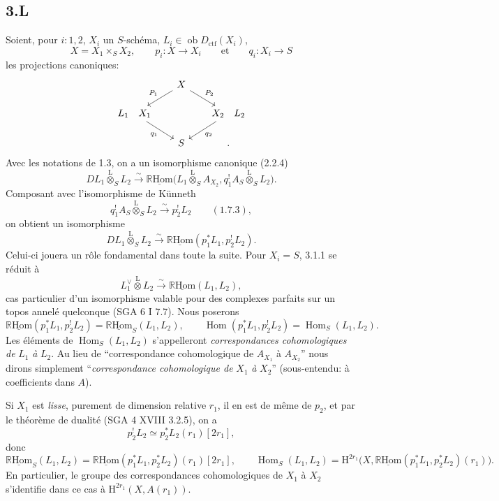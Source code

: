 \documentclass[11pt]{article}
\renewcommand{\H}{\mathrm{H}}
\DeclareMathOperator{\Hom}{Hom}
\newcommand{\R}{\mathbb{R}}\newcommand{\RHomCore}{\mathbb{R}\mathrm{Hom}}
\newcommand{\ob}{\operatorname{ob}}
\providecommand{\RHom}{\RHomCore}
\providecommand{\uRHom}{\underline{\RHom}}
\providecommand{\Dctf}{D_{\mathrm{ctf}}}
\providecommand{\Dctf}{D_{\mathrm{ctf}}}
\providecommand{\RHom}{\RHomCore}
\providecommand{\Hom}{\operatorname{Hom}}
\providecommand{\ob}{\operatorname{ob}}
\providecommand{\RHom}{\R\mathcal{H}om}
\providecommand{\R}{\mathrm R}
\providecommand{\RHom}{\RHomCore}
\providecommand{\Hom}{\operatorname{Hom}}
\begin{document}
\subsection*{3.L}
Soient, pour $i:1,2$, $X_i$ un $S$-schéma, $L_i\in\ob\Dctf(X_i)$,
\[
X=X_1\times_S X_2,
\qquad
p_i:X\longrightarrow X_i
\qquad\text{et}\qquad
q_i:X_i\longrightarrow S
\]
les projections canoniques:
\[
\begin{tikzcd}[column sep=1.8em,row sep=1.5em]
& X \arrow[dl,"P_1"'] \arrow[dr,"P_2"] & \\
L_1\quad X_1 \arrow[dr,"q_1"'] & & X_2\quad L_2 \arrow[dl,"q_2"] \\
& S & .
\end{tikzcd}
\]
Avec les notations de 1.3, on a un isomorphisme canonique (2.2.4)
\[
DL_1\overset{\mathrm{L}}{\otimes}_S L_2
\xrightarrow{\sim}
\uRHom\bigl(L_1\overset{\mathrm{L}}{\otimes}_S A_{X_2},
q_1^!A_S\overset{\mathrm{L}}{\otimes}_S L_2\bigr).
\]
Composant avec l'isomorphisme de Künneth
\[
q_1^!A_S\overset{\mathrm{L}}{\otimes}_S L_2
\xrightarrow{\sim}p_2^!L_2 \qquad (1.7.3),
\]
on obtient un isomorphisme
\begin{equation}
DL_1\overset{\mathrm{L}}{\otimes}_S L_2
\xrightarrow{\sim}
\uRHom(p_1^*L_1,p_2^!L_2).
\tag{3.1.1}
\end{equation}
Celui-ci jouera un rôle fondamental dans toute la suite. Pour $X_i=S$, 3.1.1 se réduit à
\[
L_1^\vee\overset{\mathrm{L}}{\otimes}L_2\xrightarrow{\sim}\uRHom(L_1,L_2),
\]
cas particulier d'un isomorphisme valable pour des complexes parfaits sur un topos annelé quelconque (SGA 6 I 7.7). Nous poserons
\begin{equation}
\uRHom(p_1^*L_1,p_2^!L_2)=\uRHom_S(L_1,L_2),
\qquad
\Hom(p_1^*L_1,p_2^!L_2)=\Hom_S(L_1,L_2).
\tag{3.1.2}
\end{equation}
Les éléments de $\Hom_S(L_1,L_2)$ s'appelleront \emph{correspondances cohomologiques de} $L_1$ \emph{à} $L_2$. Au lieu de ``correspondance cohomologique de $A_{X_1}$ à $A_{X_2}$'' nous dirons simplement ``\emph{correspondance cohomologique de} $X_1$ \emph{à} $X_2$'' (sous-entendu: à coefficients dans $A$).

Si $X_1$ est \emph{lisse}, purement de dimension relative $r_1$, il en est de même de $p_2$, et par le théorème de dualité (SGA 4 XVIII 3.2.5), on a
\[
p_2^!L_2\simeq p_2^*L_2(r_1)[2r_1],
\]
donc
\begin{equation}
\uRHom_S(L_1,L_2)=\uRHom(p_1^*L_1,p_2^*L_2)(r_1)[2r_1],
\qquad
\Hom_S(L_1,L_2)=\H^{2r_1}\bigl(X,\uRHom(p_1^*L_1,p_2^*L_2)(r_1)\bigr).
\tag{3.1.3}
\end{equation}
En particulier, le groupe des correspondances cohomologiques de $X_1$ à $X_2$ s'identifie dans ce cas à $\H^{2r_1}(X,A(r_1))$.
\end{document}
